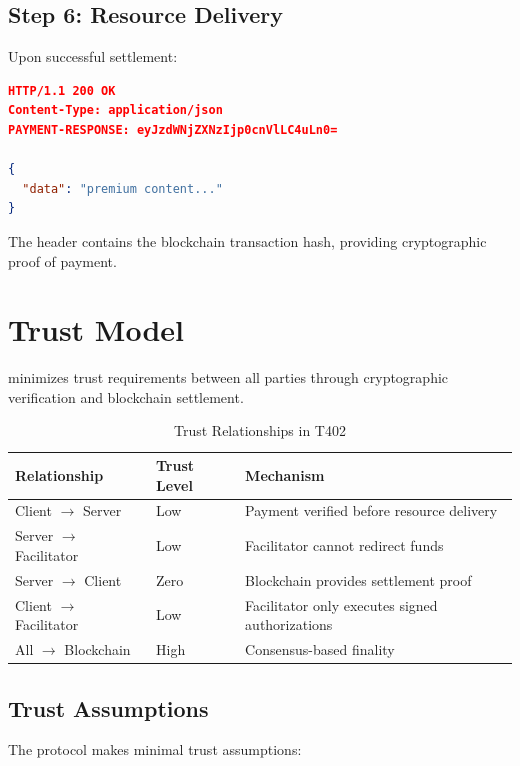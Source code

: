 \subsection{Step 6: Resource Delivery}

Upon successful settlement:

\begin{lstlisting}[language=json,caption={Successful response with settlement proof}]
HTTP/1.1 200 OK
Content-Type: application/json
PAYMENT-RESPONSE: eyJzdWNjZXNzIjp0cnVlLC4uLn0=

{
  "data": "premium content..."
}
\end{lstlisting}

The  header contains the blockchain transaction hash, providing cryptographic proof of payment.

\section{Trust Model}
\label{sec:trust-model}

\tprotocol{} minimizes trust requirements between all parties through cryptographic verification and blockchain settlement.

\begin{table}[htbp]
\centering
\caption{Trust Relationships in T402}
\label{tab:trust-model}
\begin{tabular}{llp{6cm}}
\toprule
\textbf{Relationship} & \textbf{Trust Level} & \textbf{Mechanism} \\
\midrule
Client $\to$ Server & Low & Payment verified before resource delivery \\
Server $\to$ Facilitator & Low & Facilitator cannot redirect funds \\
Server $\to$ Client & Zero & Blockchain provides settlement proof \\
Client $\to$ Facilitator & Low & Facilitator only executes signed authorizations \\
All $\to$ Blockchain & High & Consensus-based finality \\
\bottomrule
\end{tabular}
\end{table}

\subsection{Trust Assumptions}
\label{sec:trust-assumptions}

The protocol makes minimal trust assumptions:

